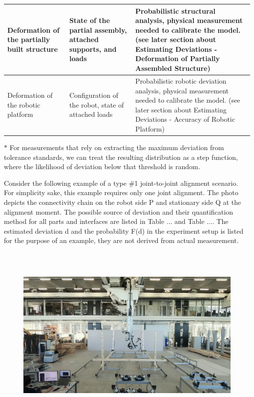 \documentclass[11pt]{book}
\begin{document}
\begin{table}[H]
\begin{adjustbox}{max width=\textwidth}
\begin{tabular}{p{3.39cm}p{3.12cm}p{9.37cm}}
\hline
\multicolumn{1}{|p{3.39cm}}{{\scriptsize Deformation of the partially built structure }} & 
\multicolumn{1}{|p{3.12cm}}{{\scriptsize State of the partial assembly, attached supports, and loads }} & 
\multicolumn{1}{|p{9.37cm}|}{{\scriptsize Probabilistic structural analysis, physical measurement needed to calibrate the model. (see later section about Estimating Deviations - Deformation of Partially Assembled Structure)\par}} \\ 
\hline
\multicolumn{1}{|p{3.39cm}}{{\scriptsize Deformation of the robotic platform }} & 
\multicolumn{1}{|p{3.12cm}}{{\scriptsize Configuration of the robot, state of attached loads}} & 
\multicolumn{1}{|p{9.37cm}|}{{\scriptsize Probabilistic robotic deviation analysis, physical measurement needed to calibrate the model. (see later section about Estimating Deviations - Accuracy of Robotic Platform)\par}} \\ 
\hline
\end{tabular}
\end{adjustbox}
\end{table}
\vspace{1\baselineskip}
{\footnotesize $\ast$ For measurements that rely on extracting the maximum deviation from tolerance standards, we can treat the resulting distribution as a step function, where the likelihood of deviation below that threshold is random. \par}

Consider the following example of a type $\#$1 joint-to-joint alignment scenario. For simplicity sake, this example requires only one joint alignment. The photo depicts the connectivity chain on the robot side P and stationary side Q at the alignment moment. The possible source of deviation and their quantification method for all parts and interfaces are listed in Table $\ldots$ and Table $\ldots$. The estimated deviation d and the probability F(d) in the experiment setup is listed for the purpose of an example, they are not derived from actual measurement.

\begin{figure}[H]
\includegraphics[width=15.92cm,height=8.96cm]{./images/image6.png}
\end{figure}
\end{document}
